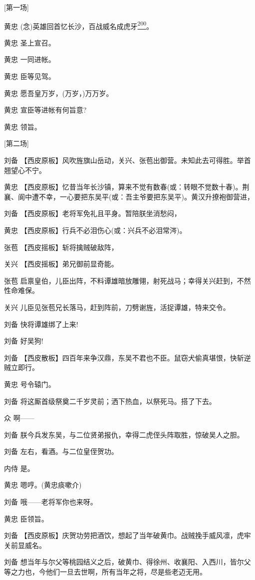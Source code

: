 {[}第一场{]}

黄忠
(念)英雄回首忆长沙，百战威名成虎牙\protect\hyperlink{fn200}{\textsuperscript{200}}。

黄忠 圣上宣召。

黄忠 一同进帐。

黄忠 臣等见驾。

黄忠 愿吾皇万岁，(万岁，)万万岁。

黄忠 宣臣等进帐有何旨意?

黄忠 领旨。

{[}第二场{]}

刘备
【西皮原板】风吹旌旗山岳动，关兴、张苞出御营。未知此去可得胜。举首翘望心不宁。

黄忠
【西皮原板】忆昔当年长沙镇，算来不觉有数春(或：转眼不觉数十春)。荆襄、阆中遭不幸，一心要把东吴平(或：吾主爷要把东吴平)。黄汉升撩袍御营进，

刘备 【西皮原板】老将军免礼且平身。暂陪朕坐消愁闷，

黄忠 【西皮原板】行兵不必泪伤心(或：兴兵不必泪常涔)。

张苞 【西皮摇板】斩将擒贼破敌阵，

关兴 【西皮摇板】弟兄御前显奇能。

张苞
启禀皇伯，儿臣出阵，不料谭雄暗放雕翎，射死战马；幸得关兴赶到，不然性命难保。

关兴 儿臣见张苞兄长落马，赶到阵前，刀劈谢旌，活捉谭雄，特来交令。

刘备 快将谭雄绑了上来!

刘备 好吴狗!

刘备
【西皮散板】四百年来争汉鼎，东吴不君也不臣。鼠窃犬偷真堪恨，快斩逆贼立即行。

黄忠 号令辕门。

刘备 将这厮首级祭奠二千岁灵前；洒下热血，以祭死马。搭了下去。

众 啊------

刘备 朕今兵发东吴，与二位贤弟报仇，幸得二虎侄头阵取胜，惊破吴人之胆。

刘备 左右，看酒。与二位皇侄贺功。

内侍 是。

黄忠 嗯哼。(黄忠痰嗽介)

刘备 哦------老将军你也来呀。

黄忠 臣领旨。

刘备
【西皮原板】庆贺功劳把酒饮，想起了当年破黄巾。战贼挽手威风凛，虎牢关前显威名。

刘备
想当年与尔父等桃园结义之后，破黄巾、得徐州、收襄阳、入西川，皆尔父等之力也，今他们一旦去世啊，所有当年之将，尽是些老迈无用。

